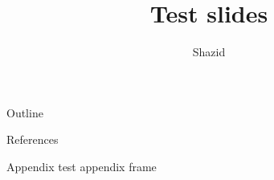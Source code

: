 \documentclass[12pt, aspectratio=169]{beamer}
\title{Test slides}
\author{Shazid}
\begin{document}
	{
		\addtocounter{framenumber}{-2}    %

		\begin{frame}
			\titlepage
		\end{frame}

		\begin{frame}{Outline}
			\tableofcontents[subsectionstyle=hide]
		\end{frame}
	}

	

	\appendix

	\begingroup
		\renewcommand{\section}[2]{}%
		\begin{frame}[allowframebreaks]{References}
				\def\bibfont{\footnotesize}
				
		\end{frame}
	\endgroup

    \begin{frame}{Appendix}
        test appendix frame
    \end{frame}
\end{document}
